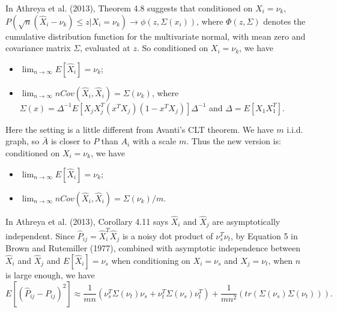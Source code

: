 \documentclass[a4paper]{article}
\begin{document}
In Athreya et al. (2013), Theorem 4.8 suggests that conditioned on $X_i = \nu_k$, 
$P \left( \sqrt{n} (\hat{X}_i - \nu_k) \le z | X_i = \nu_k \right) \rightarrow \phi(z, \Sigma(x_i))$, where $\Phi(z, \Sigma)$ denotes the cumulative distribution function for the multivariate normal, with mean zero and covariance matrix $\Sigma$, evaluated at $z$.
So conditioned on $X_i = \nu_k$, we have
\begin{itemize}
\item $\lim_{n \rightarrow \infty} E[\hat{X}_i] = \nu_k$;
\item $\lim_{n \rightarrow \infty} n Cov(\hat{X}_i, \hat{X}_i) = \Sigma(\nu_k)$, where $\Sigma(x) = \Delta^{-1} E[X_j X_j^T (x^T X_j)(1 - x^T X_j)] \Delta^{-1}$ and $\Delta = E[X_1 X_1^T]$.
\end{itemize}




Here the setting is a little different from Avanti's CLT theorem. We have $m$ i.i.d. graph, so $\bar{A}$ is closer to $P$ than $A_i$ with a scale $m$. Thus the new version is: conditioned on $X_i = \nu_k$, we have
\begin{itemize}
\item $\lim_{n \rightarrow \infty} E[\hat{X}_i] = \nu_k$;
\item $\lim_{n \rightarrow \infty} n Cov(\hat{X}_i, \hat{X}_i) = \Sigma(\nu_k)/m$.
\end{itemize}

In Athreya et al. (2013), Corollary 4.11 says $\hat{X}_i$ and $\hat{X}_j$ are asymptotically independent. Since $\hat{P}_{ij} = \hat{X}_i^T \hat{X}_j$ is a noisy dot product of $\nu_s^T \nu_t$, by Equation 5 in Brown and Rutemiller (1977), combined with asymptotic independence between $\hat{X}_i$ and $\hat{X}_j$ and $E[\hat{X}_i] = \nu_s$ when conditioning on $X_i = \nu_s$ and $X_j = \nu_t$, when $n$ is large enough, we have
\begin{equation}
\label{eqn:1}
	E[(\hat{P}_{ij} - P_{ij})^2] \approx
    \frac{1}{m n} \left( \nu_s^T \Sigma(\nu_t) \nu_s + \nu_t^T \Sigma(\nu_s) \nu_t^T \right)
    + \frac{1}{m n^2} \left( tr(\Sigma(\nu_s) \Sigma(\nu_t)) \right).
\end{equation}
\end{document}
